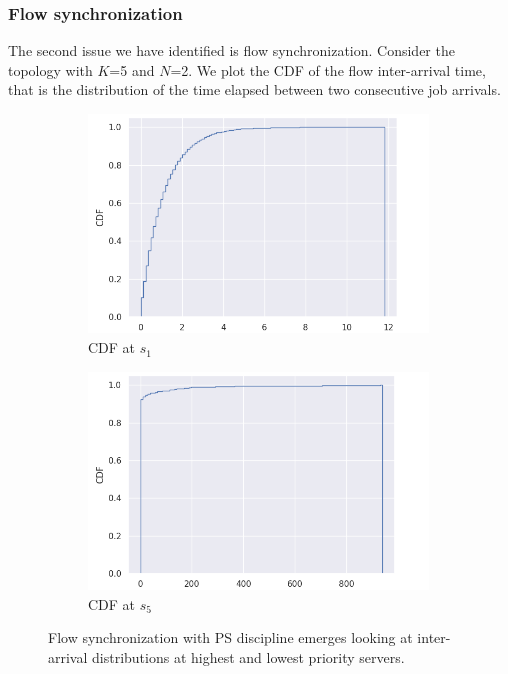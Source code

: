 \subsubsection{Flow synchronization}
The second issue we have identified is flow synchronization. Consider the topology with $K$=5 and $N$=2. We plot the CDF of the flow inter-arrival time, that is the distribution of the time elapsed between two consecutive job arrivals. 
\begin{figure}
	\centering
	\captionsetup{width=.8\linewidth}
	\begin{subfigure}{.5\textwidth}
		\centering
		\includegraphics[width=0.99\textwidth]{Chapter3/Figures/inter_arrival0_PS}
		\caption{CDF at $s_1$}
		\label{fig:iatimes-ps-s1}
	\end{subfigure}%
	\hfill
	\begin{subfigure}{.5\textwidth}
		\centering
		\includegraphics[width=0.99\textwidth]{Chapter3/Figures/inter_arrival4_PS}
		\caption{CDF at $s_5$}
		\label{fig:iatimes-ps-s5}
	\end{subfigure}%
	\caption{Flow synchronization with PS discipline emerges looking at inter-arrival distributions at highest and lowest priority servers.}
	\label{fig:iatimes-ps}
\end{figure}%
